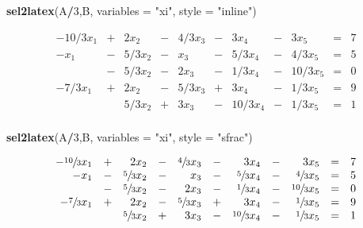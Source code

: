 \documentclass[]{article}
\newenvironment{Shaded}{\begin{snugshade}}{\end{snugshade}}
\newcommand{\DataTypeTok}[1]{\textcolor[rgb]{0.13,0.29,0.53}{#1}}
\newcommand{\DecValTok}[1]{\textcolor[rgb]{0.00,0.00,0.81}{#1}}
\newcommand{\KeywordTok}[1]{\textcolor[rgb]{0.13,0.29,0.53}{\textbf{#1}}}
\newcommand{\NormalTok}[1]{#1}
\newcommand{\OperatorTok}[1]{\textcolor[rgb]{0.81,0.36,0.00}{\textbf{#1}}}
\newcommand{\StringTok}[1]{\textcolor[rgb]{0.31,0.60,0.02}{#1}}
\begin{document}
\begin{Shaded}
\begin{Highlighting}[]
\KeywordTok{sel2latex}\NormalTok{(A}\OperatorTok{/}\DecValTok{3}\NormalTok{,B, }\DataTypeTok{variables =} \StringTok{"xi"}\NormalTok{, }\DataTypeTok{style =} \StringTok{"inline"}\NormalTok{)}
\end{Highlighting}
\end{Shaded}

\[
 \begin{array}{rrrrrrrrrrr}
-10/3 x_{1} & + & 2 x_{2} & - & 4/3 x_{3} & - & 3 x_{4} & - & 3 x_{5} & = & 7 \\ 
-x_{1} & - & 5/3 x_{2} & - & x_{3} & - & 5/3 x_{4} & - & 4/3 x_{5} & = & 5 \\ 
& - & 5/3 x_{2} & - & 2 x_{3} & - & 1/3 x_{4} & - & 10/3 x_{5} & = & 0 \\ 
-7/3 x_{1} & + & 2 x_{2} & - & 5/3 x_{3} & + & 3 x_{4} & - & 1/3 x_{5} & = & 9 \\ 
& & 5/3 x_{2} & + & 3 x_{3} & - & 10/3 x_{4} & - & 1/3 x_{5} & = & 1 \\ 
\end{array} 
\]

\begin{Shaded}
\begin{Highlighting}[]
\KeywordTok{sel2latex}\NormalTok{(A}\OperatorTok{/}\DecValTok{3}\NormalTok{,B, }\DataTypeTok{variables =} \StringTok{"xi"}\NormalTok{, }\DataTypeTok{style =} \StringTok{"sfrac"}\NormalTok{)}
\end{Highlighting}
\end{Shaded}

\[
 \begin{array}{rrrrrrrrrrr}
-\sfrac{10}{3} x_{1} & + & 2 x_{2} & - & \sfrac{4}{3} x_{3} & - & 3 x_{4} & - & 3 x_{5} & = & 7 \\ 
-x_{1} & - & \sfrac{5}{3} x_{2} & - & x_{3} & - & \sfrac{5}{3} x_{4} & - & \sfrac{4}{3} x_{5} & = & 5 \\ 
& - & \sfrac{5}{3} x_{2} & - & 2 x_{3} & - & \sfrac{1}{3} x_{4} & - & \sfrac{10}{3} x_{5} & = & 0 \\ 
-\sfrac{7}{3} x_{1} & + & 2 x_{2} & - & \sfrac{5}{3} x_{3} & + & 3 x_{4} & - & \sfrac{1}{3} x_{5} & = & 9 \\ 
& & \sfrac{5}{3} x_{2} & + & 3 x_{3} & - & \sfrac{10}{3} x_{4} & - & \sfrac{1}{3} x_{5} & = & 1 \\ 
\end{array} 
\]
\end{document}
